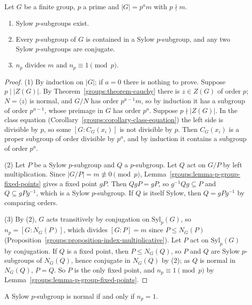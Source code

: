 \begin{theorem}[Sylow]\label{groups:theorem-sylow}
Let $G$ be a finite group, $p$ a prime and $|G| = p^a m$ with $p \nmid m$.
\begin{enumerate}
\item Sylow $p$-subgroups exist.
\item Every $p$-subgroup of $G$ is contained in a Sylow $p$-subgroup, and any two
Sylow $p$-subgroups are conjugate.
\item $n_p$ divides $m$ and $n_p \equiv 1 \pmod p$.
\end{enumerate}
\end{theorem}

\begin{proof}
(1) By induction on $|G|$; if $a = 0$ there is nothing to prove. Suppose
$p \mid |Z(G)|$. By Theorem~\ref{groups:theorem-cauchy} there is $z \in Z(G)$ of order
$p$; $N = \langle z \rangle$ is normal, and $G/N$ has order $p^{a-1}m$, so by
induction it has a subgroup of order $p^{a-1}$, whose preimage in $G$ has order
$p^a$. Suppose $p \nmid |Z(G)|$. In the class equation
(Corollary~\ref{groups:corollary-class-equation}) the left side is divisible by
$p$, so some $[G : C_G(x_i)]$ is not divisible by $p$. Then $C_G(x_i)$ is a proper
subgroup of order divisible by $p^a$, and by induction it contains a subgroup of
order $p^a$.

(2) Let $P$ be a Sylow $p$-subgroup and $Q$ a $p$-subgroup. Let $Q$ act on $G/P$
by left multiplication. Since $|G/P| = m \not\equiv 0 \pmod p$,
Lemma~\ref{groups:lemma-p-group-fixed-points} gives a fixed point $gP$. Then
$QgP = gP$, so $g^{-1}Qg \subseteq P$ and $Q \subseteq gPg^{-1}$, which is a Sylow
$p$-subgroup. If $Q$ is itself Sylow, then $Q = gPg^{-1}$ by comparing orders.

(3) By (2), $G$ acts transitively by conjugation on $\mathrm{Syl}_p(G)$, so
$n_p = [G : N_G(P)]$, which divides $[G : P] = m$ since $P \leq N_G(P)$
(Proposition~\ref{groups:proposition-index-multiplicative}). Let $P$ act on
$\mathrm{Syl}_p(G)$ by conjugation. If $Q$ is a fixed point, then $P \leq N_G(Q)$, so
$P$ and $Q$ are Sylow $p$-subgroups of $N_G(Q)$, hence conjugate in $N_G(Q)$ by
(2); as $Q$ is normal in $N_G(Q)$, $P = Q$. So $P$ is the only fixed point, and
$n_p \equiv 1 \pmod p$ by Lemma~\ref{groups:lemma-p-group-fixed-points}.
\end{proof}

\begin{corollary}\label{groups:corollary-unique-sylow}
A Sylow $p$-subgroup is normal if and only if $n_p = 1$.
\end{corollary}

